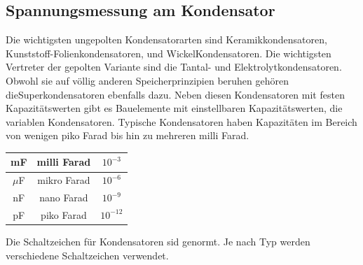 \documentclass[
a4paper,     %
 headsepline, %
11pt         %
]{scrartcl}  %
\begin{document}
\subsection{Spannungsmessung am Kondensator}
Die wichtigsten ungepolten Kondensatorarten sind Keramikkondensatoren, Kunststoff-Folienkondensatoren, und WickelKondensatoren. Die wichtigsten Vertreter der gepolten Variante sind die Tantal- und Elektrolytkondensatoren. Obwohl sie auf völlig anderen Speicherprinzipien beruhen gehören dieSuperkondensatoren ebenfalls dazu. Neben diesen Kondensatoren mit festen Kapazitätswerten gibt es Bauelemente mit einstellbaren Kapazitätswerten, die variablen Kondensatoren.
Typische Kondensatoren haben Kapazitäten im Bereich von wenigen piko Farad bis hin zu mehreren milli Farad.
\begin{center}
\begin{tabular}{ c | c | c }
    \hline
    mF  & milli Farad & $10^{-3}$ \\ \hline
    $\mu$F  & mikro Farad & $10^{-6}$ \\ \hline
    nF  & nano Farad  & $10^{-9}$ \\ \hline
    pF  & piko Farad  & $10^{-12}$ \\
    \hline
\end{tabular}
\end{center}
Die Schaltzeichen für Kondensatoren sid genormt. Je nach Typ werden verschiedene Schaltzeichen verwendet.
\begin{figure}
\centering
\def\svgwidth{\columnwidth}

\end{figure}
\end{document}

